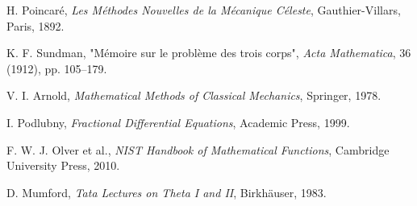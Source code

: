 \documentclass[12pt]{article}
\begin{document}
\begin{thebibliography}{99}

H. Poincaré, \textit{Les Méthodes Nouvelles de la Mécanique Céleste}, Gauthier-Villars, Paris, 1892.

K. F. Sundman, "Mémoire sur le problème des trois corps", \textit{Acta Mathematica}, 36 (1912), pp. 105–179.

V. I. Arnold, \textit{Mathematical Methods of Classical Mechanics}, Springer, 1978.

I. Podlubny, \textit{Fractional Differential Equations}, Academic Press, 1999.

F. W. J. Olver et al., \textit{NIST Handbook of Mathematical Functions}, Cambridge University Press, 2010.

D. Mumford, \textit{Tata Lectures on Theta I and II}, Birkhäuser, 1983.

\end{thebibliography}
\end{document}
